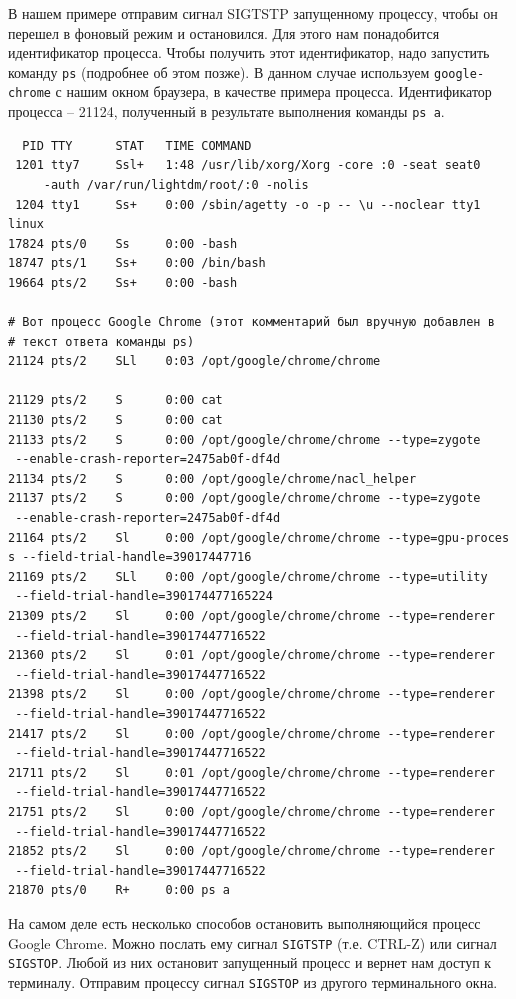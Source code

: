 \documentclass[a4paper,12pt,final,openany]{extbook}
\begin{document}
В нашем примере отправим сигнал SIGTSTP запущенному процессу, чтобы он
перешел в фоновый режим и остановился. Для этого нам понадобится
идентификатор процесса. Чтобы получить этот идентификатор, надо
запустить команду \texttt{ps} (подробнее об этом позже). В данном случае
используем \texttt{google-chrome} с нашим окном браузера, в качестве
примера процесса. Идентификатор процесса -- 21124, полученный в результате выполнения команды \texttt{ps\ a}.
\begin{verbatim}
  PID TTY      STAT   TIME COMMAND
 1201 tty7     Ssl+   1:48 /usr/lib/xorg/Xorg -core :0 -seat seat0
     -auth /var/run/lightdm/root/:0 -nolis
 1204 tty1     Ss+    0:00 /sbin/agetty -o -p -- \u --noclear tty1 linux
17824 pts/0    Ss     0:00 -bash
18747 pts/1    Ss+    0:00 /bin/bash
19664 pts/2    Ss+    0:00 -bash

# Вот процесс Google Chrome (этот комментарий был вручную добавлен в
# текст ответа команды ps)
21124 pts/2    SLl    0:03 /opt/google/chrome/chrome

21129 pts/2    S      0:00 cat
21130 pts/2    S      0:00 cat
21133 pts/2    S      0:00 /opt/google/chrome/chrome --type=zygote
 --enable-crash-reporter=2475ab0f-df4d
21134 pts/2    S      0:00 /opt/google/chrome/nacl_helper
21137 pts/2    S      0:00 /opt/google/chrome/chrome --type=zygote
 --enable-crash-reporter=2475ab0f-df4d
21164 pts/2    Sl     0:00 /opt/google/chrome/chrome --type=gpu-proces
s --field-trial-handle=39017447716
21169 pts/2    SLl    0:00 /opt/google/chrome/chrome --type=utility
 --field-trial-handle=390174477165224
21309 pts/2    Sl     0:00 /opt/google/chrome/chrome --type=renderer
 --field-trial-handle=39017447716522
21360 pts/2    Sl     0:01 /opt/google/chrome/chrome --type=renderer
 --field-trial-handle=39017447716522
21398 pts/2    Sl     0:00 /opt/google/chrome/chrome --type=renderer
 --field-trial-handle=39017447716522
21417 pts/2    Sl     0:00 /opt/google/chrome/chrome --type=renderer
 --field-trial-handle=39017447716522
21711 pts/2    Sl     0:01 /opt/google/chrome/chrome --type=renderer
 --field-trial-handle=39017447716522
21751 pts/2    Sl     0:00 /opt/google/chrome/chrome --type=renderer
 --field-trial-handle=39017447716522
21852 pts/2    Sl     0:00 /opt/google/chrome/chrome --type=renderer
 --field-trial-handle=39017447716522
21870 pts/0    R+     0:00 ps a
\end{verbatim}

На самом деле есть несколько способов остановить выполняющийся процесс
Google Chrome. Можно послать ему сигнал \texttt{SIGTSTP} (т.е. CTRL-Z) или
сигнал \texttt{SIGSTOP}. Любой из них остановит запущенный
процесс и вернет нам доступ к терминалу. Отправим процессу сигнал
\texttt{SIGSTOP} из другого терминального окна.
\end{document}
